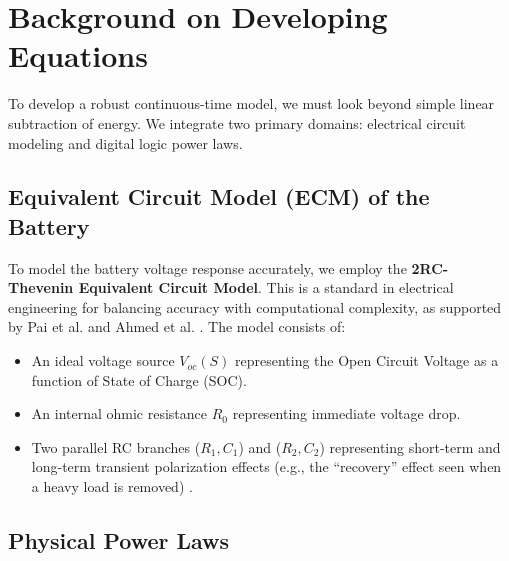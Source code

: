 \documentclass[12pt]{article}
\begin{document}

\section{Background on Developing Equations}

To develop a robust continuous-time model, we must look beyond simple linear subtraction of energy. We integrate two primary domains: electrical circuit modeling and digital logic power laws.

\subsection{Equivalent Circuit Model (ECM) of the Battery}

To model the battery voltage response accurately, we employ the \textbf{2RC-Thevenin Equivalent Circuit Model}. This is a standard in electrical engineering for balancing accuracy with computational complexity, as supported by Pai et al. \cite{6} and Ahmed et al. \cite{9}. The model consists of:
\begin{itemize}
    \item An ideal voltage source $V_{oc}(S)$ representing the Open Circuit Voltage as a function of State of Charge (SOC).
    \item An internal ohmic resistance $R_0$ representing immediate voltage drop.
    \item Two parallel RC branches ($R_1, C_1$) and ($R_2, C_2$) representing short-term and long-term transient polarization effects (e.g., the ``recovery'' effect seen when a heavy load is removed) \cite{7}.
\end{itemize}

\subsection{Physical Power Laws}
\end{document}

